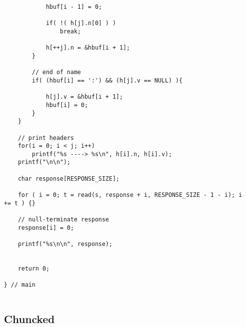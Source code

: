 \begin{lstlisting}
            hbuf[i - 1] = 0;
            
            if( !( h[j].n[0] ) )
                break;
            
            h[++j].n = &hbuf[i + 1];
        }

        // end of name
        if( (hbuf[i] == ':') && (h[j].v == NULL) ){

            h[j].v = &hbuf[i + 1];
            hbuf[i] = 0;
        }
    }

    // print headers
    for(i = 0; i < j; i++)
        printf("%s ----> %s\n", h[i].n, h[i].v);
    printf("\n\n");

    char response[RESPONSE_SIZE];

    for ( i = 0; t = read(s, response + i, RESPONSE_SIZE - 1 - i); i += t ) {}

    // null-terminate response
    response[i] = 0;

    printf("%s\n\n", response);


    return 0;

} // main
    
\end{lstlisting}


\newpage\subsection{Chuncked}

